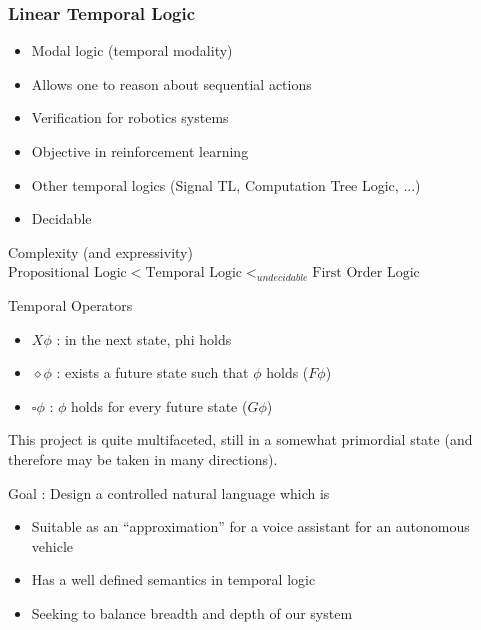 \documentclass{beamer}
\begin{document}
\begin{frame}
\frametitle{Linear Temporal Logic}
\begin{itemize}
\item Modal logic (temporal modality)
\item Allows one to reason about sequential actions
\item Verification for robotics systems
\item Objective in reinforcement learning
\item Other temporal logics (Signal TL, Computation Tree Logic, ...)
\item Decidable 
\end{itemize}

\begin{block}{Complexity (and expressivity)}
$\text{Propositional Logic} < \text{Temporal Logic} <_{undecidable} \text{First Order Logic}$
\end{block}

\begin{exampleblock}{Temporal Operators}
\begin{itemize}
\item $X \phi$ : in the next state, phi holds
\item $\diamond \phi$ : exists a future state such that $\phi$ holds ($F \phi$)
\item $\square \phi$ : $\phi$ holds for every future state ($G \phi$)
\end{itemize}
\end{exampleblock}

\end{frame}


\begin{frame}
\begin{exampleblock}{}
This project is quite multifaceted, still in a somewhat primordial state (and therefore may be taken in many directions).
\end{exampleblock}

\begin{block}{}
Goal : Design a controlled natural language which is 
\end{block}

\begin{itemize}
\item Suitable as an ``approximation'' for a voice assistant for an autonomous vehicle
\item Has a well defined semantics in temporal logic
\item Seeking to balance breadth and depth of our system
\end{itemize}
\end{frame}
\end{document}
